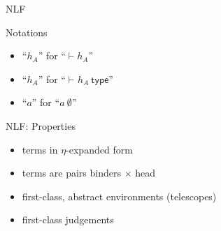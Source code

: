 \documentclass[ignorenonframetext,red]{beamer}
\newcommand\postbinder{\cdot}
\newcommand\prd[2]{\ensuremath\Pi{#1}^{#2}\postbinder}
\newcommand\srt[1]{\ensuremath\mathsf{#1}}
\newcommand\app[1]{{#1}\ }
\newcommand\tlam[2]{\ensuremath\lambda{#1}^{#2}\postbinder}
\newcommand\lam{\tlam}
\newcommand\eent[1]{[{#1}]}
\newcommand\econs[2]{{#1}\eent{#2}}
\newcommand\esing[1]{\econs{}{#1}}
\newcommand\jlangt[4]{{#2}\vdash_{\mathrm{#1}}{#3}:{#4}}
\newcommand\jlangA[3]{{#2}\vdash_{\mathrm{#1}}{#3}\mathsf{\ type}}
\newcommand\jnlft[3]{\jlangt{}{#1}{#2}{#3}}
\newcommand\jnlfA[2]{\jlangA{}{#1}{#2}}
\newcommand\nat{\mathbb N}
\begin{document}
\begin{frame}{NLF}
  \begin{block}{Notations}
    \begin{itemize}
    \item ``$h_A$'' for ``$\vdash h_A$''
    \item ``$h_A$'' for ``$\jnlfA{}{h_A}$''
    \item ``$a$'' for ``$\app a \emptyset$''
    \end{itemize}
  \end{block}
  \begin{example}
  \end{example}
\end{frame}

\begin{frame}{NLF: Properties}
  \begin{itemize}
  \item terms in $\eta$-expanded form
  \item terms are pairs binders $\times$ head
  \item first-class, abstract environments (telescopes)
  \item first-class judgements
  \end{itemize}
\end{frame}
\end{document}

